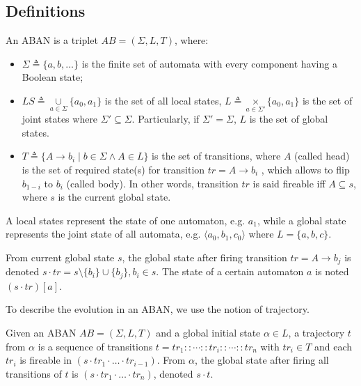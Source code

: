 \subsection{Definitions}
\begin{definition}[ABAN]\label{def:ABAN}
An ABAN is a triplet $AB = (\Sigma,L,T)$, where:
\begin{itemize}
\item $\Sigma\triangleq\{a,b,\ldots\}$ is the finite set of automata with every component having a Boolean state;
\item $LS\triangleq \underset{a\in \Sigma}{\cup} \{a_0,a_1\}$ is the set of all local states, $L\triangleq \underset{a\in \Sigma'}{\times} \{a_0,a_1\}$ is the set of joint states where $\Sigma'\subseteq\Sigma$. Particularly, if $\Sigma'=\Sigma$, $L$ is the set of global states. 
\item $T\triangleq \{A\rightarrow b_i\mid b\in \Sigma \land A\in L\}$ is the set of transitions, where $A$ (called head) is the set of required state(s) for transition $tr=A\to b_i$ , which allows to flip $b_{1-i}$ to $b_i$ (called body). In other words, transition $tr$ is said fireable iff $A\subseteq s$, where $s$ is the current global state.
\end{itemize}
\end{definition}

A local states represent the state of one automaton, e.g. $a_1$, while a global state represents the joint state of all automata, e.g. $\langle a_0, b_1,c_0 \rangle$ where $L=\{a,b,c\}$.

\begin{definition}[Dynamics]
    From current global state $s$, the global state after firing transition $tr=A\to b_j$ is denoted $s \cdot tr = s \setminus \{b_i\} \cup \{b_j\}, b_i \in s$.
    The state of a certain automaton $a$ is noted $(s\cdot tr)[a]$.
\end{definition}

To describe the evolution in an ABAN, we use the notion of trajectory.
\begin{definition}[Trajectory]
Given an ABAN $AB = (\Sigma,L,T)$ and a global initial state $\alpha\in L$, a trajectory $t$ from $\alpha$ is a sequence of transitions $t=tr_1::\cdots :: tr_i::\cdots ::tr_n$ with $tr_i\in T$ and each $tr_i$ is fireable in $(s \cdot tr_1 \cdot \ldots \cdot tr_{i-1})$.
From $\alpha$, the global state after firing all transitions of $t$ is $(s \cdot tr_1 \cdot \ldots \cdot tr_n)$, denoted $s \cdot t$.
\end{definition}

